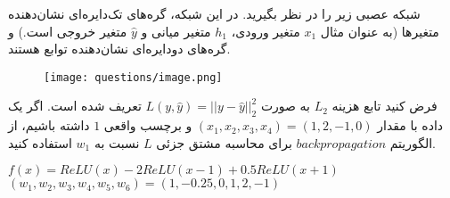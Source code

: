 

شبکه عصبی زیر را در نظر بگیرید.  در این شبکه، گره‌های تک‌دایره‌ای نشان‌دهنده متغیرها (به عنوان مثال $x_1$ متغیر ورودی، $h_1$ متغیر میانی و $\hat{y}$ متغیر خروجی است.) و گره‌های دودایره‌ای نشان‌دهنده توابع هستند.

\begin{figure}[H]
\centering 
\texttt{[image: questions/image.png]}
\end{figure}


فرض کنید تابع هزینه $L_2$ به صورت $L(y, \hat{y})=||y-\hat{y}||^2_2$ تعریف شده است. اگر یک داده با مقدار $(x_1,x_2,x_3,x_4)=(1,2,-1,0)$ و برچسب واقعی $1$ داشته باشیم، از الگوریتم  $backpropagation$ برای محاسبه مشتق جزئی $L$ نسبت به $w_1$ استفاده کنید.

\begin{center}
    $f(x) = ReLU(x) - 2 ReLU(x-1) + 0.5ReLU(x+1)$\\
    $(w_1, w_2, w_3, w_4, w_5, w_6) = (1, -0.25, 0, 1, 2, -1)$
\end{center}